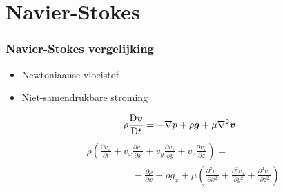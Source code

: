 \documentclass[t]{beamer}
\begin{document}
	\section{Navier-Stokes}
	\begin{frame}
		\frametitle{Navier-Stokes vergelijking}
		\begin{itemize}
  			\item Newtoniaanse vloeistof
  			\item Niet-samendrukbare stroming
  		\end{itemize}
  		\pause
  		\vspace{1cm}
  		\begin{equation}
			\rho \frac{\mathrm{D} \boldsymbol{v}}{\mathrm{D} t} = -\nabla p + \rho \boldsymbol{g} + \mu \nabla^2 \boldsymbol{v}
		\end{equation}
		\pause
		\vspace{0.2cm}
		\begin{align}
			&\rho \left(\frac{\partial v_x}{\partial t} + v_x \frac{\partial v_x}{\partial x} + v_y \frac{\partial v_x}{\partial y} + v_z \frac{\partial v_x}{\partial z} \right) = \nonumber\\
			&\hspace{2cm} -\frac{\partial p}{\partial x} +\rho g_x + \mu \left( \frac{\partial^2 v_x}{\partial x^2} + \frac{\partial^2 v_x}{\partial y^2} + \frac{\partial^2 v_x}{\partial z^2} \right)
		\end{align}
	\end{frame}
\end{document}
